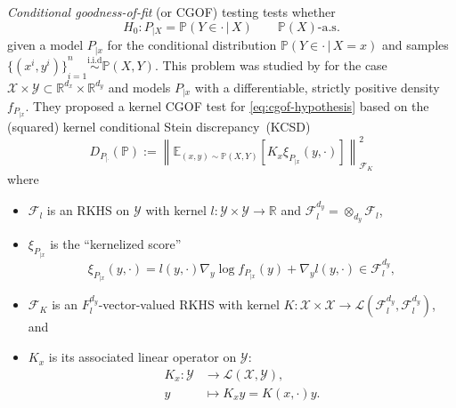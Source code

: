 \documentclass{uai2023} %
\begin{document}
\emph{Conditional goodness-of-fit} (or CGOF) testing tests whether 
\begin{equation}\label{eq:cgof-hypothesis}
H_0\colon P_{|X} = \mathbb{P}(Y \in \cdot \,|\, X) \qquad \mathbb{P}(X)\text{-a.s.}
\end{equation}
given a model $P_{|x}$ for the conditional distribution $\mathbb{P}(Y \in \cdot \,|\, X=x)$ and samples ${\{(x^{i}, y^{i})\}}_{i=1}^n \stackrel{\text{i.i.d}}{\sim} \mathbb{P}(X, Y)$.
This problem was studied by \citet{jitkrittum2020testing} for the case $\mathcal{X} \times \mathcal{Y} \subset \mathbb{R}^{d_x} \times \mathbb{R}^{d_y}$ and models $P_{|x}$ with a differentiable, strictly positive density $f_{P_{|x}}$.
They proposed a kernel CGOF test for \cref{eq:cgof-hypothesis} based on the (squared) kernel conditional Stein discrepancy~(KCSD)
\begin{equation}\label{eq:cgof-metric}
    D_{P_{|\cdot}}(\mathbb{P}) := \left \| \mathbb{E}_{(x,y) \sim \mathbb{P}(X, Y)}\left [ K_{x} \xi_{P_{|x}}(y, \cdot) \right ]  \right \|^2_{\mathcal  F_{K}}
\end{equation}
where
\begin{itemize}
    \item $\mathcal  F_{l} $  is an RKHS on $ \mathcal  Y $ with kernel $l \colon \mathcal{Y} \times \mathcal{Y} \to \mathbb{R}$ and $ \mathcal  F^{d_{y}}_l = \otimes_{d_y} \mathcal  F_{l}$,
    \item $\xi_{P_{|x}} $ is the ``kernelized score''
	\begin{equation*}
	    \xi_{P_{|x}}(y, \cdot) = l(y, \cdot)\nabla_{ y } \log f_{P_{|x}}(y) + \nabla_{ y }  l(y, \cdot) \in \mathcal F_{l}^{d_y},
	\end{equation*}
    \item $ \mathcal  F_{K} $ is an $F^{d_y}_{l}$-vector-valued RKHS with kernel
	$K\colon \mathcal{X} \times \mathcal{X}  \to \mathcal{L}(\mathcal{F}^{d_y}_{l}, \mathcal{F}^{d_{y}}_{l})$, and
    \item $K_{x}$ is its associated linear operator on $ \mathcal  Y $:
    \begin{equation*}
    \begin{aligned}
	K_{x} \colon  \mathcal  Y&\longrightarrow \mathcal  L(\mathcal{X}, \mathcal{Y}), \\
	 y &\longmapsto K_{x} y = K(x, \cdot)y.
    \end{aligned}
    \end{equation*}
\end{itemize}
\end{document}
